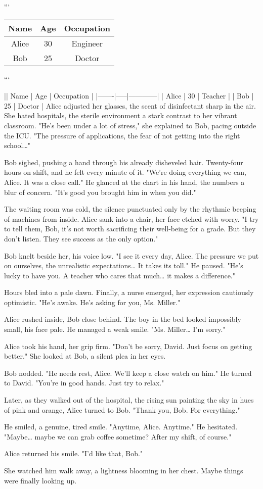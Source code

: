 \documentclass{article}
\begin{document}
```
\begin{tabular}{ccc}
    \hline
    Name & Age & Occupation \\
    \hline
    Alice & 30 & Engineer \\
    Bob & 25 & Doctor \\
    \hline
\end{tabular}
```

|| Name  | Age | Occupation |
|-------|-----|------------|
| Alice | 30  | Teacher    |
| Bob   | 25  | Doctor     |
Alice adjusted her glasses, the scent of disinfectant sharp in the air. She hated hospitals, the sterile environment a stark contrast to her vibrant classroom. "He's been under a lot of stress," she explained to Bob, pacing outside the ICU. "The pressure of applications, the fear of not getting into the right school…"

Bob sighed, pushing a hand through his already disheveled hair. Twenty-four hours on shift, and he felt every minute of it. "We're doing everything we can, Alice. It was a close call." He glanced at the chart in his hand, the numbers a blur of concern. "It's good you brought him in when you did."

The waiting room was cold, the silence punctuated only by the rhythmic beeping of machines from inside. Alice sank into a chair, her face etched with worry. "I try to tell them, Bob, it's not worth sacrificing their well-being for a grade. But they don't listen. They see success as the only option."

Bob knelt beside her, his voice low. "I see it every day, Alice. The pressure we put on ourselves, the unrealistic expectations… It takes its toll." He paused. "He's lucky to have you. A teacher who cares that much… it makes a difference."

Hours bled into a pale dawn. Finally, a nurse emerged, her expression cautiously optimistic. "He's awake. He's asking for you, Ms. Miller."

Alice rushed inside, Bob close behind. The boy in the bed looked impossibly small, his face pale. He managed a weak smile. "Ms. Miller… I’m sorry."

Alice took his hand, her grip firm. "Don't be sorry, David. Just focus on getting better." She looked at Bob, a silent plea in her eyes.

Bob nodded. "He needs rest, Alice. We’ll keep a close watch on him." He turned to David. "You're in good hands. Just try to relax."

Later, as they walked out of the hospital, the rising sun painting the sky in hues of pink and orange, Alice turned to Bob. "Thank you, Bob. For everything."

He smiled, a genuine, tired smile. "Anytime, Alice. Anytime." He hesitated. "Maybe… maybe we can grab coffee sometime? After my shift, of course."

Alice returned his smile. "I'd like that, Bob."

She watched him walk away, a lightness blooming in her chest. Maybe things were finally looking up.
\end{document}
